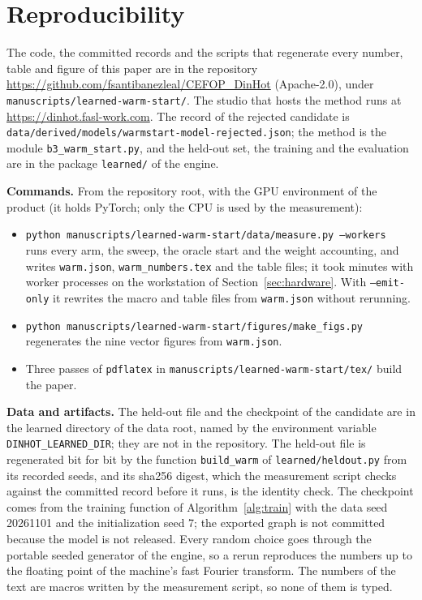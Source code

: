 \section{Reproducibility}\label{sec:repro}
\sloppy

The code, the committed records and the scripts that regenerate every number, table and figure of this paper are in the repository \url{https://github.com/fsantibanezleal/CEFOP_DinHot} (Apache-2.0), under \texttt{manuscripts/learned-warm-start/}. The studio that hosts the method runs at \url{https://dinhot.fasl-work.com}. The record of the rejected candidate is \texttt{data/derived/models/warmstart-model-rejected.json}; the method is the module \texttt{b3\_warm\_start.py}, and the held-out set, the training and the evaluation are in the package \texttt{learned/} of the engine.

\textbf{Commands.} From the repository root, with the GPU environment of the product (it holds PyTorch; only the CPU is used by the measurement):
\begin{itemize}
\item \texttt{python manuscripts/learned-warm-start/data/measure.py --workers \nWorkers{}} runs every arm, the sweep, the oracle start and the weight accounting, and writes \texttt{warm.json}, \texttt{warm\_numbers.tex} and the table files; it took \runtimeMin{} minutes with \nWorkers{} worker processes on the workstation of Section~\ref{sec:hardware}. With \texttt{--emit-only} it rewrites the macro and table files from \texttt{warm.json} without rerunning.
\item \texttt{python manuscripts/learned-warm-start/figures/make\_figs.py} regenerates the nine vector figures from \texttt{warm.json}.
\item Three passes of \texttt{pdflatex} in \texttt{manuscripts/learned-warm-start/tex/} build the paper.
\end{itemize}

\textbf{Data and artifacts.} The held-out file and the checkpoint of the candidate are in the learned directory of the data root, named by the environment variable \texttt{DINHOT\_LEARNED\_DIR}; they are not in the repository. The held-out file is regenerated bit for bit by the function \texttt{build\_warm} of \texttt{learned/heldout.py} from its recorded seeds, and its sha256 digest, which the measurement script checks against the committed record before it runs, is the identity check. The checkpoint comes from the training function of Algorithm~\ref{alg:train} with the data seed 20261101 and the initialization seed 7; the exported graph is not committed because the model is not released. Every random choice goes through the portable seeded generator of the engine, so a rerun reproduces the numbers up to the floating point of the machine's fast Fourier transform. The numbers of the text are macros written by the measurement script, so none of them is typed.
